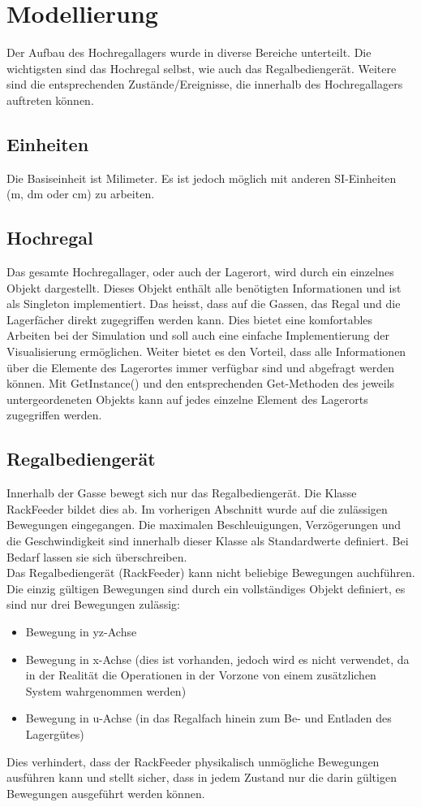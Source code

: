 \section{Modellierung}
Der Aufbau des Hochregallagers wurde in diverse Bereiche unterteilt. Die wichtigsten sind das Hochregal selbst, wie auch das Regalbediengerät. Weitere sind die entsprechenden Zustände/Ereignisse, die innerhalb des Hochregallagers auftreten können. 
%
\subsection{Einheiten}
Die Basiseinheit ist Milimeter. Es ist jedoch möglich mit anderen SI-Einheiten (m, dm oder cm) zu arbeiten.
%
\subsection{Hochregal}
Das gesamte Hochregallager, oder auch der Lagerort, wird durch ein einzelnes Objekt dargestellt. Dieses Objekt enthält alle benötigten Informationen und ist als Singleton implementiert. Das heisst, dass auf die Gassen, das Regal und die Lagerfächer direkt zugegriffen werden kann. Dies bietet eine komfortables Arbeiten bei der Simulation und soll auch eine einfache Implementierung der Visualisierung ermöglichen. Weiter bietet es den Vorteil, dass alle Informationen über die Elemente des Lagerortes immer verfügbar sind und abgefragt werden können. Mit GetInstance() und den entsprechenden Get-Methoden des jeweils untergeordeneten Objekts kann auf jedes einzelne Element des Lagerorts zugegriffen werden.
%
\subsection{Regalbediengerät}
Innerhalb der Gasse bewegt sich nur das Regalbediengerät. Die Klasse RackFeeder bildet dies ab. Im vorherigen Abschnitt wurde auf die zulässigen Bewegungen eingegangen. Die maximalen Beschleuigungen, Verzögerungen und die Geschwindigkeit sind innerhalb dieser Klasse als Standardwerte definiert. Bei Bedarf lassen sie sich überschreiben.\\
Das Regalbediengerät (RackFeeder) kann nicht beliebige Bewegungen auchführen. Die einzig gültigen Bewegungen sind durch ein vollständiges Objekt definiert, es sind nur drei Bewegungen zulässig: 
%
\begin{itemize}
  \item Bewegung in yz-Achse
  \item Bewegung in x-Achse (dies ist vorhanden, jedoch wird es nicht verwendet, da in der Realität die Operationen in der Vorzone von einem zusätzlichen System wahrgenommen werden)
  \item Bewegung in u-Achse (in das Regalfach hinein zum Be- und Entladen des Lagergütes)
\end{itemize}
%
Dies verhindert, dass der RackFeeder physikalisch unmögliche Bewegungen ausführen kann und stellt sicher, dass in jedem Zustand nur die darin gültigen Bewegungen ausgeführt werden können.
%
